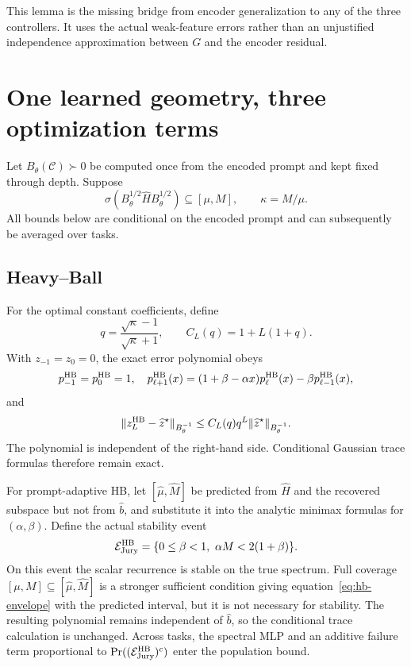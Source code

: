 \documentclass[11pt]{article}
\begin{document}
This lemma is the missing bridge from encoder generalization to any of the
three controllers.  It uses the actual weak-feature errors rather than an
unjustified independence approximation between $G$ and the encoder residual.

\section{One learned geometry, three optimization terms}

Let $B_\theta(\mathcal C)\succ0$ be computed once from the encoded prompt and
kept fixed through depth.  Suppose
\[
 \sigma(B_\theta^{1/2}\widehat H B_\theta^{1/2})
 \subseteq[\mu,M],
 \qquad \kappa=M/\mu.
\]
All bounds below are conditional on the encoded prompt and can subsequently be
averaged over tasks.

\subsection{Heavy--Ball}

For the optimal constant coefficients, define
\[
 q=\frac{\sqrt\kappa-1}{\sqrt\kappa+1},
 \qquad C_L(q)=1+L(1+q).
\]
With $z_{-1}=z_0=0$, the exact error polynomial obeys
\[
 p_{-1}^{\rm HB}=p_0^{\rm HB}=1,
 \quad
 p_{\ell+1}^{\rm HB}(x)
 =(1+\beta-\alpha x)p_\ell^{\rm HB}(x)
 -\beta p_{\ell-1}^{\rm HB}(x),
\]
and
\begin{equation}
 \|z_L^{\rm HB}-\widehat z^\star\|_{B_\theta^{-1}}
 \leq C_L(q)q^L
 \|\widehat z^\star\|_{B_\theta^{-1}}.
 \label{eq:hb-envelope}
\end{equation}
The polynomial is independent of the right-hand side.  Conditional Gaussian
trace formulas therefore remain exact.

For prompt-adaptive HB, let
$[\widehat\mu,\widehat M]$ be predicted from $\widehat H$ and the recovered
subspace but not from $\widehat b$, and substitute it into the analytic
minimax formulas for $(\alpha,\beta)$.  Define the actual stability event
\[
 \mathcal E_{\rm Jury}^{\rm HB}
 =\{0\leq\beta<1,\ \alpha M<2(1+\beta)\}.
\]
On this event the scalar recurrence is stable on the true spectrum.  Full
coverage $[\mu,M]\subseteq[\widehat\mu,\widehat M]$ is a stronger sufficient
condition giving equation~\eqref{eq:hb-envelope} with the predicted interval,
but it is not necessary for stability.  The resulting polynomial remains
independent of $\widehat b$, so the conditional trace calculation is
unchanged.  Across tasks, the spectral MLP and an additive failure term
proportional to $\Pr((\mathcal E_{\rm Jury}^{\rm HB})^c)$ enter the population
bound.
\end{document}
